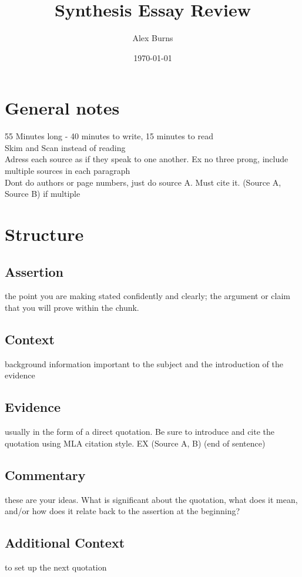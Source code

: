 \documentclass[11pt]{article}
\author{Alex Burns}
\date{\today}
\title{Synthesis Essay Review}
\begin{document}
\maketitle
\setcounter{tocdepth}{1}
\tableofcontents


\section*{General notes}
\label{sec:orgcf4eb17}
55 Minutes long - 40 minutes to write, 15 minutes to read \\
Skim and Scan instead of reading \\
Adress each source as if they speak to one another. Ex  no three prong, include multiple sources in each paragraph \\
Dont do authors or page numbers, just do source A. Must cite it. (Source A, Source B) if multiple \\
\section*{Structure}
\label{sec:org8d44517}
\subsection*{Assertion}
\label{sec:org7aedd02}
the point you are making stated confidently and clearly; the argument or claim that you will prove within the chunk. \\
\subsection*{Context}
\label{sec:orga700e6a}
background information important to the subject and the introduction of the evidence
\subsection*{Evidence}
\label{sec:org6d8f32b}
usually in the form of a direct quotation. Be sure to introduce and cite the quotation using MLA citation style. EX (Source A, B) (end of sentence)
\subsection*{Commentary}
\label{sec:org89b159b}
these are your ideas. What is significant about the quotation, what does it mean, and/or how does it relate back to the assertion at the beginning?
\subsection*{Additional Context}
\label{sec:orgbdce74d}
to set up the next quotation
\end{document}

